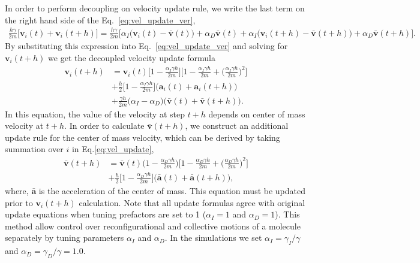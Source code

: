 \documentclass[../talant.diss.submit.tex]{subfiles}
\begin{document}
%
%
In order to perform decoupling on velocity update rule, we write the last term
on the right hand side of the Eq.~\ref{eq:vel_update_ver},
%
%
\begin{align}
  \label{eq:tmp_vel_de}
  \frac{h\gamma}{2m} \big[ \bm{v}_i(t) + \bm{v}_i(t+h) \big]  = 
  \frac{h\gamma}{2m} \big[ \alpha_I \big( \bm{v}_i(t) - \bm{\bar v}(t) \big) + \alpha_D \bm{\bar v}(t)
    + \alpha_I \big( \bm{v}_i(t+h)  - \bm{\bar v}(t+h) \big) + \alpha_D \bm{\bar v}(t+h)\big].    
\end{align}
%
%
By substituting this expression into Eq.~\ref{eq:vel_update_ver} and solving for $\bm{v}_i(t+h)$ we get
the decoupled velocity update formula
%
%
\begin{equation}
  \begin{aligned}
    \label{eq:vel_update_de}
    \bm{v}_{i}(t+h) & = \bm{v}_{i}(t)\Big[ 1 - \frac{\alpha_{I}\gamma h}{2m}\Big] 
    \Big[1 - \frac{\alpha_{I} \gamma h}{2m} + \Big( \frac{\alpha_{I}\gamma h}{2m} \Big)^2 \Big]  \\
    & + \frac{h}{2} \big[1 - \frac{\alpha_{I}\gamma h}{2m} \big]
    \big( \bm{a}_{i}(t) + \bm{a}_{i}(t+h) \big)  \\ 
    & +\frac{\gamma h}{2m} \big( \alpha_{I} - \alpha_{D})(\bm{\bar v}(t) + \bm{\bar v}(t+h) \big).  
  \end{aligned}
\end{equation}
%
In this equation, the value of the velocity at step $t+h$ depends on center of mass velocity at $t+h$. In order to
calculate $\bm{\bar v}(t+h)$, we construct an additional update rule for the center of mass velocity, which can be
derived by taking summation over $i$ in Eq.\ref{eq:vel_update}, 
%
%
\begin{equation}
  \begin{aligned}
    \label{eq:vel_update_COM}
    \bm{\bar v}(t+h) & = \bm{\bar v}(t) \Big(1 - \frac{\alpha_{D} \gamma h}{2m} \Big) 
    \Big[1 - \frac{\alpha_{D} \gamma h}{2m} + \Big( \frac{\alpha_{D}\gamma h}{2m} \Big)^2 \Big] \\
    & + \frac{h}{2} \Big[1 - \frac{\alpha_{D} \gamma h}{2m}  \Big]
    \big ( \bm{\bar a}(t) + \bm{\bar a}(t+h) \big ), 
  \end{aligned}
\end{equation}
%
where, $\bm{\bar a}$ is the acceleration of the center of mass. This equation must be updated prior to
$\bm{v}_i(t+h)$ calculation. Note that all update formulas agree with original update equations when tuning
prefactors are set to 1 ($\alpha_{I}=1$ and $\alpha_{D}=1$). This method allow control over reconfigurational
and collective motions of a molecule separately by tuning parameters $\alpha_{I}$ and $\alpha_{D}$.
In the simulations we set $\alpha_{I} = \gamma_{I}/\gamma$ and $\alpha_{D}=\gamma_{D}/\gamma=1.0$.
\end{document}
